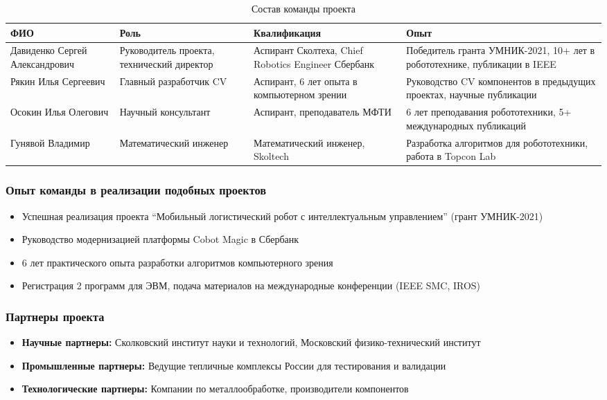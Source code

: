 \documentclass[12pt,a4paper]{article}
\begin{document}
\begin{table}[h]
\centering
\begin{tabular}{|p{3.5cm}|p{3cm}|p{4cm}|p{4.5cm}|}
\hline
\textbf{ФИО} & \textbf{Роль} & \textbf{Квалификация} & \textbf{Опыт} \\
\hline
Давиденко Сергей Александрович & Руководитель проекта, технический директор & Аспирант Сколтеха, Chief Robotics Engineer Сбербанк & Победитель гранта УМНИК-2021, 10+ лет в робототехнике, публикации в IEEE \\
\hline
Рякин Илья Сергеевич & Главный разработчик CV & Аспирант, 6 лет опыта в компьютерном зрении & Руководство CV компонентов в предыдущих проектах, научные публикации \\
\hline
Осокин Илья Олегович & Научный консультант & Аспирант, преподаватель МФТИ & 6 лет преподавания робототехники, 5+ международных публикаций \\
\hline
Гунявой Владимир & Математический инженер & Математический инженер, Skoltech & Разработка алгоритмов для робототехники, работа в Topcon Lab \\
\hline
\end{tabular}
\caption{Состав команды проекта}
\end{table}

\subsubsection{Опыт команды в реализации подобных проектов}
\begin{itemize}
    \item Успешная реализация проекта ``Мобильный логистический робот с интеллектуальным управлением'' (грант УМНИК-2021)
    \item Руководство модернизацией платформы Cobot Magic в Сбербанк
    \item 6 лет практического опыта разработки алгоритмов компьютерного зрения
    \item Регистрация 2 программ для ЭВМ, подача материалов на международные конференции (IEEE SMC, IROS)
\end{itemize}

\subsubsection{Партнеры проекта}
\begin{itemize}
    \item \textbf{Научные партнеры:} Сколковский институт науки и технологий, Московский физико-технический институт
    \item \textbf{Промышленные партнеры:} Ведущие тепличные комплексы России для тестирования и валидации
    \item \textbf{Технологические партнеры:} Компании по металлообработке, производители компонентов
\end{itemize}
\end{document}
